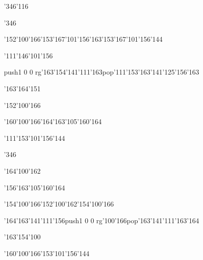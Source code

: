 \null\vfill\ipa\centerline{\enskip\enskip\enskip\enskip\enskip\enskip\enskip\enskip\enskip\enskip\enskip\enskip\enskip}\medskip\centerline{\enskip\enskip\enskip\enskip\enskip\enskip\enskip\enskip\enskip\enskip\enskip\enskip\char'346\char'116}\medskip\centerline{\enskip\char'346\enskip\enskip\enskip\enskip\enskip\enskip\enskip\enskip\enskip\enskip}\medskip\centerline{\enskip\enskip\enskip\enskip\enskip\enskip\enskip\enskip\enskip\enskip\enskip\enskip\enskip\enskip}\medskip\centerline{\enskip\char'152\char'100\char'166\enskip\char'153\char'167\char'101\char'156\char'163\enskip\char'153\char'167\char'101\char'156\char'144\enskip\enskip\enskip}\medskip\centerline{\enskip\char'111\enskip\enskip\enskip\enskip\enskip\enskip\enskip\enskip\enskip\char'146\char'101\char'156\enskip\enskip\enskip}\medskip\centerline{\enskip\pdfcolorstack\match push{1 0 0 rg}\char'163\char'154\char'141\char'111\char'163\pdfcolorstack\match pop{}\enskip\char'111\char'153\enskip\char'163\char'141\char'125\char'156\char'163\enskip\enskip\enskip}\medskip\centerline{\enskip\enskip\enskip\char'163\char'164\char'151\enskip\enskip\enskip\enskip\enskip\enskip}\medskip\centerline{\enskip\enskip\enskip\enskip\enskip\enskip\enskip\char'152\char'100\char'166\enskip\enskip\enskip\enskip\enskip}\medskip\vfill\footline{\hfil\tt\folio\hfil}\eject
\null\vfill\ipa\centerline{\enskip\enskip\enskip\enskip\char'160\char'100\char'166\enskip\char'164\char'163\char'105\char'160\char'164}\medskip\centerline{\enskip\char'111\enskip\enskip\enskip\enskip\enskip\char'153\char'101\char'156\char'144\enskip\enskip\enskip}\medskip\centerline{\enskip\char'346\enskip\enskip\enskip\enskip\enskip\enskip\enskip\enskip\enskip\enskip}\medskip\centerline{\enskip\enskip\enskip\enskip\enskip\enskip\enskip\enskip\enskip\enskip\enskip\char'164\char'100\char'162}\medskip\centerline{\enskip\enskip\enskip\enskip\enskip\enskip\enskip\enskip\enskip\enskip\enskip\char'156\char'163\char'105\char'160\char'164\enskip\enskip\enskip}\medskip\centerline{\enskip\enskip\enskip\char'154\char'100\char'166\enskip\char'152\char'100\char'162\enskip\char'154\char'100\char'166\enskip\enskip\enskip}\medskip\centerline{\enskip\char'164\char'163\char'141\char'111\char'156\enskip\pdfcolorstack\match push{1 0 0 rg}\char'100\char'166\pdfcolorstack\match pop{}\enskip\char'163\char'141\char'111\char'163\char'164\enskip\enskip\enskip}\medskip\centerline{\enskip\enskip\enskip\char'163\char'154\char'100\enskip\enskip\enskip\enskip\enskip\enskip}\medskip\centerline{\enskip\enskip\enskip\enskip\enskip\enskip\enskip\char'160\char'100\char'166\enskip\char'153\char'101\char'156\char'144}\medskip\vfill\footline{\hfil\tt\folio\hfil}\eject
